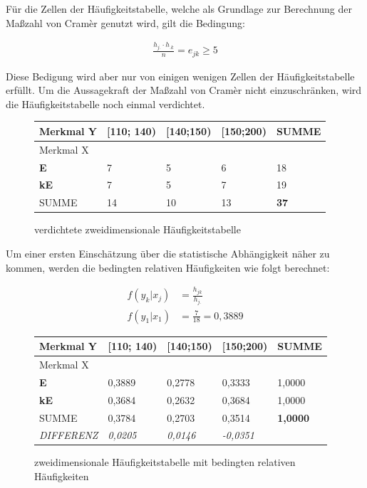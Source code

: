 Für die Zellen der Häufigkeitstabelle, welche als Grundlage zur Berechnung der Maßzahl von Cramèr genutzt wird, gilt die Bedingung:

\begin{align}
  \frac{h_{j.} \cdot h_{.k}}{n} = e_{jk} \geq 5
\end{align}

Diese Bedigung wird aber nur von einigen wenigen Zellen der Häufigkeitstabelle erfüllt. Um die Aussagekraft der Maßzahl von Cramèr nicht einzuschränken, wird die Häufigkeitstabelle noch einmal verdichtet.

\begin{figure}[H]
  \centering
  \small
\begin{tabular}{l|lll|l}
Merkmal Y   & \textbf{{[}110; 140)} & \textbf{{[}140;150)} & \textbf{{[}150;200)} & SUMME       \\ \hline
Merkmal X   &                       &                      &                      &             \\
\textbf{E}  & 7                     & 5                    & 6                    & 18          \\
\textbf{kE} & 7                     & 5                    & 7                    & 19          \\ \hline
SUMME       & 14                    & 10                   & 13                   & \textbf{37}
\end{tabular}
\caption{verdichtete zweidimensionale Häufigkeitstabelle}
\end{figure}

Um einer ersten Einschätzung über die statistische Abhängigkeit näher zu kommen, werden die bedingten relativen Häufigkeiten wie folgt berechnet:

\begin{align}
  f(y_k|x_j) &= \frac{h_{jk}}{h_{j.}}\\
  f(y_1|x_1) &= \frac{7}{18} = 0,3889
\end{align}

\begin{figure}[H]
\centering
\small
\begin{tabular}{l|lll|l}
Merkmal Y          & \textbf{{[}110; 140)} & \textbf{{[}140;150)} & \textbf{{[}150;200)} & SUMME           \\ \hline
Merkmal X          &                       &                      &                      &                 \\
\textbf{E}         & 0,3889                & 0,2778               & 0,3333               & 1,0000          \\
\textbf{kE}        & 0,3684                & 0,2632               & 0,3684               & 1,0000          \\ \hline
SUMME              & 0,3784                & 0,2703               & 0,3514               & \textbf{1,0000} \\
\textit{DIFFERENZ} & \textit{0,0205}       & \textit{0,0146}      & \textit{-0,0351}     &
\end{tabular}
\caption{zweidimensionale Häufigkeitstabelle mit bedingten relativen Häufigkeiten}
\end{figure}

